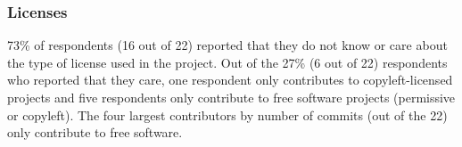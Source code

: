 \subsubsection{Licenses}

73\% of respondents (16 out of 22) reported that they do not know or care about the type of license used in the project. Out of the 27\% (6 out of 22) respondents who reported that they care, one respondent only contributes to copyleft-licensed projects and five respondents only contribute to free software projects (permissive or copyleft). The four largest contributors by number of commits (out of the 22) only contribute to free software.
